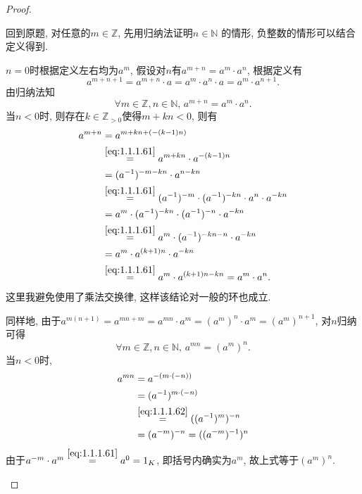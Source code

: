 \begin{proof}
\begin{enumerate}[(1)]
    回到原题, 对任意的$m \in \mathbb{Z}$, 先用归纳法证明$n \in \mathbb{N}$
    的情形, 负整数的情形可以结合定义得到.

    $n = 0$时根据定义左右均为$a^m$, 假设对$n$有$a^{m + n} = a^m \cdot a^n$, 根据定义有
    \[
        a^{m + n + 1} = a^{m + n} \cdot a = a^m \cdot a^n \cdot a = a^m \cdot a^{n + 1}.
    \]
    由归纳法知
    \begin{equation}
        \forall m \in \mathbb{Z}, n \in \mathbb{N} ,\, a^{m + n} = a^m \cdot a^n.
        \tag{*}
        \label{eq:1.1.1.61}
    \end{equation} 
    当$n < 0$时, 则存在$k \in \mathbb{Z}_{>0}$使得$m + kn < 0$,
    则有
    \[
    \begin{aligned}
        a^{m + n} &= a^{m + kn + (-(k - 1)n)}\\
        &\overset{\eqref{eq:1.1.1.61}}= a^{m + kn} \cdot a^{-(k - 1)n}\\
        &= (a^{-1})^{-m - kn} \cdot a^{n - kn}\\
        &\overset{\eqref{eq:1.1.1.61}}= (a^{-1})^{-m} \cdot (a^{-1})^{-kn} \cdot a^n \cdot a^{-kn}\\
        &= a^m \cdot (a^{-1})^{-kn} \cdot (a^{-1})^{-n} \cdot a^{-kn}\\
        &\overset{\eqref{eq:1.1.1.61}}= a^m \cdot (a^{-1})^{-kn - n} \cdot a^{-kn}\\
        &= a^m \cdot a^{(k + 1)n} \cdot a^{-kn}\\
        &\overset{\eqref{eq:1.1.1.61}}= a^m \cdot a^{(k + 1)n - kn} = a^m \cdot a^n.
    \end{aligned}
    \]
    这里我避免使用了乘法交换律, 这样该结论对一般的环也成立.

    同样地, 由于$a^{m(n + 1)} = a^{mn + m} = a^{mn} \cdot a^m = (a^{m})^n \cdot a^m = (a^m)^{n + 1}$,
    对$n$归纳可得
    \begin{equation}
        \forall m \in \mathbb{Z}, n \in \mathbb{N},\, a^{mn} = (a^m)^n.
        \tag{**}
        \label{eq:1.1.1.62}
    \end{equation}
    当$n < 0$时, 
    \[
    \begin{aligned}
        a^{mn} &= a^{-(m \cdot (-n))}\\
        &= (a^{-1})^{m \cdot (-n)}\\
        &\overset{\eqref{eq:1.1.1.62}}= ((a^{-1})^m)^{-n}\\
        &= (a^{-m})^{-n} = ((a^{-m})^{-1})^n
    \end{aligned}
    \]
    由于$a^{-m} \cdot a^m \overset{\eqref{eq:1.1.1.61}}= a^0 = 1_K$, 即括号内确实为$a^m$,
    故上式等于$(a^m)^n$.
    \end{enumerate}
\end{proof}

